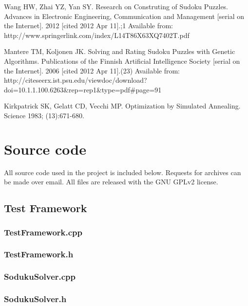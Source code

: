 \documentclass[a4paper,11pt]{kth-mag}
\begin{document}
\begin{thebibliography}{99}
Wang HW, Zhai YZ, Yan SY. Research on Construting of Sudoku Puzzles. Advances in Electronic Engineering, Communication and Management [serial on the Internet]. 2012 [cited 2012 Apr 11].;1 Available from: http://www.springerlink.com/index/L14T86X63XQ7402T.pdf

Mantere TM, Koljonen JK. Solving and Rating Sudoku Puzzles with Genetic Algorithms. Publications of the Finnish Artificial Intelligence Society [serial on the Internet]. 2006 [cited 2012 Apr 11].(23) Available from: http://citeseerx.ist.psu.edu/viewdoc/download?doi=10.1.1.100.6263\&rep=rep1\&type=pdf\#page=91

Kirkpatrick SK, Gelatt CD, Vecchi MP. Optimization by Simulated Annealing. Science 1983; (13):671-680.

\end{thebibliography}

\appendix
\addappheadtotoc

\chapter{Source code}
\lstset{language=C++}

All source code used in the project is included below.
Requests for archives can be made over email.
All files are released with the GNU GPLv2 license.

\section{Test Framework}
\subsection{TestFramework.cpp}

\subsection{TestFramework.h}


\subsection{SodukuSolver.cpp}

\subsection{SodukuSolver.h}

\end{document}

